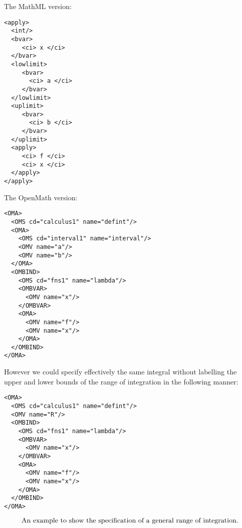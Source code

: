 \documentclass[twoside,11pt]{article}
\begin{document}
\begin{center}
\begin{myboxbopen}{4.5in}
The MathML version:
\begin{verbatim}
<apply>
  <int/>
  <bvar>
     <ci> x </ci>
  </bvar>
  <lowlimit>
     <bvar>
       <ci> a </ci>
     </bvar>
  </lowlimit>
  <uplimit>
     <bvar>
       <ci> b </ci>
     </bvar>
  </uplimit>
  <apply>
     <ci> f </ci>
     <ci> x </ci>
  </apply>
</apply>
\end{verbatim}

The OpenMath version:
\begin{verbatim}
<OMA>
  <OMS cd="calculus1" name="defint"/>
  <OMA>
    <OMS cd="interval1" name="interval"/>
    <OMV name="a"/>
    <OMV name="b"/>
  </OMA>
  <OMBIND>
    <OMS cd="fns1" name="lambda"/>
    <OMBVAR>
      <OMV name="x"/>
    </OMBVAR>
    <OMA>
      <OMV name="f"/>
      <OMV name="x"/>
    </OMA>
  </OMBIND>
</OMA>
\end{verbatim}
\end{myboxbopen}\end{center}
\begin{center}
\begin{myboxtopen}{4.5in}
However we could specify effectively the same integral without
labelling the upper and lower bounds of the range of integration in the
following manner:
\begin{verbatim}
<OMA>
  <OMS cd="calculus1" name="defint"/>
  <OMV name="R"/>
  <OMBIND>
    <OMS cd="fns1" name="lambda"/>
    <OMBVAR>
      <OMV name="x"/>
    </OMBVAR>
    <OMA>
      <OMV name="f"/>
      <OMV name="x"/>
    </OMA>
  </OMBIND>
</OMA>
\end{verbatim}
\end{myboxtopen}
\end{center}
\begin{equation}\label{general range}
\hbox{An example to show the specification of a general range of integration.}
\end{equation}
\end{document}
